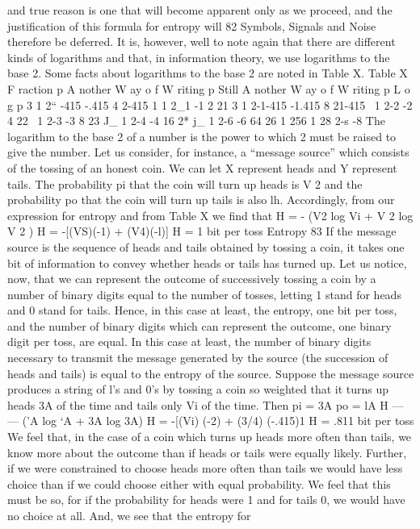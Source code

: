 and true reason is one that will become apparent only as we
proceed, and the justification of this formula for entropy will
82
Symbols, Signals and Noise
therefore be deferred. It is, however, well to note again that there
are different kinds of logarithms and that, in information theory,
we use logarithms to the base 2. Some facts about logarithms to
the base 2 are noted in Table X.
Table X
F raction p A nother W ay o f
W riting p
Still A nother W ay
o f W riting p L o g p
3 1 2“ -415 -.415
4 2-415
1 1 2_1 -1
2 21
3 1 2-1-415 -1.415
8 21-415
\ 1 2-2 -2
4 22
\ 1 2-3 -3
8 23
J_ 1 2-4 -4
16 2*
j_ 1 2-6 -6
64 26
1
256
1
28 2-s -8
The logarithm to the base 2 of a number is the power to which
2 must be raised to give the number.
Let us consider, for instance, a “message source” which consists
of the tossing of an honest coin. We can let X represent heads and
Y represent tails. The probability pi that the coin will turn up
heads is V 2 and the probability po that the coin will turn up tails
is also lh. Accordingly, from our expression for entropy and from
Table X we find that
H = - (V2 log Vi + V 2 log V 2 )
H = -[(VS)(-1) + (V4)(-l)]
H = 1 bit per toss
Entropy 83
If the message source is the sequence of heads and tails obtained
by tossing a coin, it takes one bit of information to convey whether
heads or tails has turned up.
Let us notice, now, that we can represent the outcome of successively
tossing a coin by a number of binary digits equal to the
number of tosses, letting 1 stand for heads and 0 stand for tails.
Hence, in this case at least, the entropy, one bit per toss, and the
number of binary digits which can represent the outcome, one
binary digit per toss, are equal. In this case at least, the number
of binary digits necessary to transmit the message generated by
the source (the succession of heads and tails) is equal to the entropy
of the source.
Suppose the message source produces a string of l’s and 0’s by
tossing a coin so weighted that it turns up heads 3A of the time and
tails only Vi of the time. Then
pi = 3A
po = lA
H — — ('A log ‘A + 3A log 3A)
H = -[(Vi) (-2) + (3/4) (-.415)1
H = .811 bit per toss
We feel that, in the case of a coin which turns up heads more
often than tails, we know more about the outcome than if heads
or tails were equally likely. Further, if we were constrained to
choose heads more often than tails we would have less choice than
if we could choose either with equal probability. We feel that this
must be so, for if the probability for heads were 1 and for tails 0,
we would have no choice at all. And, we see that the entropy for
